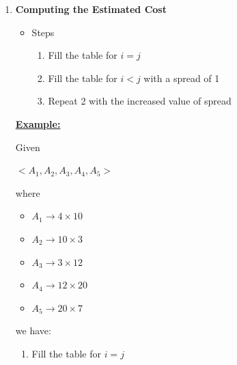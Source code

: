 \documentclass[12pt]{article}
\begin{document}
\begin{enumerate}[1.]
\begin{itemize}
\begin{itemize}
\begin{enumerate}[1.]
                \item \textbf{Computing the Estimated Cost}
                \begin{itemize}
                    \item Steps
                    \begin{enumerate}[1)]
                        \item Fill the table for $i = j$
                        \item Fill the table for $i < j$ with a spread of 1
                        \item Repeat 2 with the increased value of spread
                    \end{enumerate}
                \end{itemize}

                \bigskip

                \underline{\textbf{Example:}}

                \bigskip

                Given

                $<A_1, A_2, A_3, A_4, A_5>$

                \bigskip

                where

                \begin{itemize}
                    \item $A_1 \to 4 \times 10$
                    \item $A_2 \to 10 \times 3$
                    \item $A_3 \to 3 \times 12$
                    \item $A_4 \to 12 \times 20$
                    \item $A_5 \to 20 \times 7$
                \end{itemize}

                \bigskip

                we have:

                \bigskip

                \begin{enumerate}[1)]
                    \item Fill the table for $i = j$


\end{enumerate}
\end{enumerate}
\end{itemize}
\end{itemize}
\end{enumerate}
\end{document}
